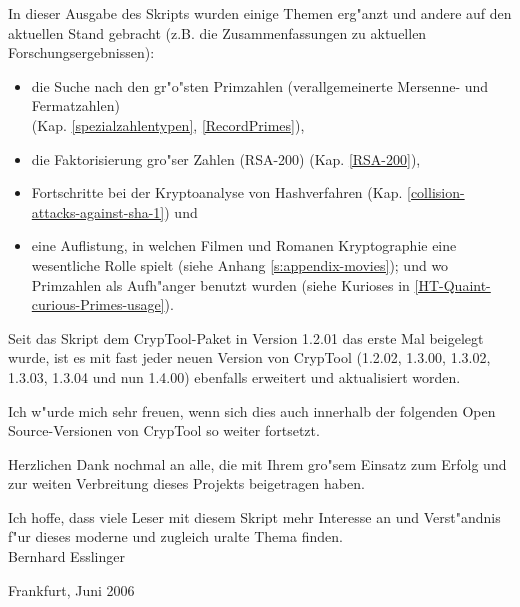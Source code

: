 In dieser Ausgabe des Skripts wurden einige Themen erg"anzt und andere auf
den aktuellen Stand gebracht (z.B. die Zusammenfassungen zu aktuellen 
Forschungsergebnissen):                   
\vspace{-7pt}
\begin{itemize}
  \item die Suche nach den gr"o"sten Primzahlen (verallgemeinerte
        Mersenne- und Fermatzahlen) \\
	(Kap. \ref{spezialzahlentypen}, \ref{RecordPrimes}),
  \item die Faktorisierung gro"ser Zahlen (RSA-200) 
        (Kap. \ref{RSA-200}),
  \item Fortschritte bei der Kryptoanalyse von Hashverfahren 
        (Kap. \ref{collision-attacks-against-sha-1}) und
  \item eine Auflistung, in welchen Filmen und Romanen Kryptographie eine
        wesentliche Rolle spielt (siehe Anhang \ref{s:appendix-movies});
        und wo Primzahlen als Aufh"anger benutzt wurden 
        (siehe Kurioses in \ref{HT-Quaint-curious-Primes-usage}).
\end{itemize}

\vspace{12pt}
Seit das Skript dem CrypTool-Paket in Version 1.2.01 das erste Mal beigelegt
wurde, ist es mit fast jeder neuen Version von CrypTool (1.2.02, 1.3.00,
1.3.02, 1.3.03, 1.3.04 und nun 1.4.00) ebenfalls erweitert und aktualisiert
worden.

Ich w"urde mich sehr freuen, wenn sich dies auch innerhalb der folgenden
Open Source-Versionen von CrypTool
so weiter fortsetzt.

Herzlichen Dank nochmal an alle, die mit Ihrem gro"sem Einsatz zum 
Erfolg und zur weiten Verbreitung dieses Projekts beigetragen haben. 

Ich hoffe, dass viele Leser mit diesem Skript mehr Interesse an und 
Verst"andnis f"ur dieses moderne und zugleich uralte Thema finden.
\\


Bernhard Esslinger

Frankfurt, Juni 2006




\newpage
